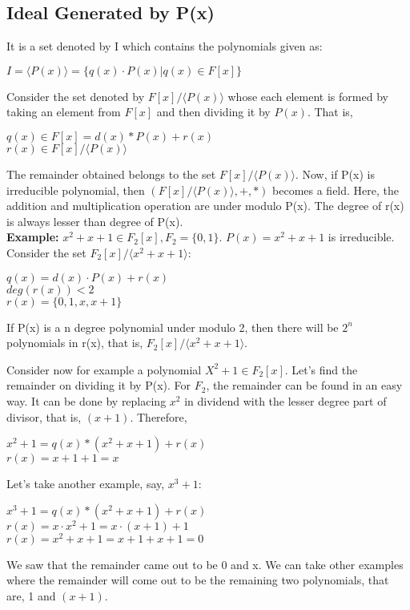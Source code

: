 \documentclass[11pt]{article}
\begin{document}
\subsection{Ideal Generated by P(x)}
It is a set denoted by I which contains the polynomials given as:
\begin{center}
    $I = \langle P(x) \rangle = \{q(x) \cdot P(x) | q(x) \in F[x]\}$
\end{center}

Consider the set denoted by $F[x]/\langle P(x)  \rangle$ whose each element is formed by taking an element from $F[x]$ and then dividing it by $P(x)$. That is,
\begin{center}
    $q(x) \in F[x] = d(x) * P(x) + r(x)$\\
    \vspace{1mm}
    $r(x) \in F[x]/\langle P(x)  \rangle$
\end{center}
The remainder obtained belongs to the set $F[x]/\langle P(x)\rangle$. Now, if P(x) is irreducible polynomial, then $(F[x]/\langle P(x) \rangle, +, *)$ becomes a field. Here, the addition and multiplication operation are under modulo P(x). The degree of r(x) is always lesser than degree of P(x).\\

\textbf{Example:} $x^2 + x + 1 \in F_2[x], F_2 = \{0, 1\}$. $P(x) = x^2 + x + 1$ is irreducible.\\

Consider the set $F_2[x]/\langle x^2 + x + 1\rangle$:
\begin{center}
    $q(x) = d(x) \cdot P(x) + r(x)$\\
    $deg(r(x)) < 2$\\
    $r(x) = \{0, 1, x, x + 1\}$
\end{center}

If P(x) is a n degree polynomial under modulo 2, then there will be $2^n$ polynomials in r(x), that is, $F_2[x]/\langle x^2 + x + 1\rangle$.

Consider now for example a polynomial $X^2 + 1 \in F_2[x]$. Let's find the remainder on dividing it by P(x). For $F_2$, the remainder can be found in an easy way. It can be done by replacing $x^2$ in dividend with the lesser degree part of divisor, that is, $(x + 1)$. Therefore, 
\begin{center}
    $x^2 + 1 = q(x) * (x^2 + x + 1) + r(x)$\\
    $r(x) = x + 1 + 1 = x$
\end{center}

Let's take another example, say, $x^3 + 1$:
\begin{center}
    $x^3 + 1 = q(x) * (x^2 + x + 1) + r(x)$\\
    $r(x) = x \cdot x^2 + 1 = x \cdot (x + 1) + 1$\\
    $r(x) = x^2 + x + 1 = x + 1 + x + 1 = 0$
\end{center}
We saw that the remainder came out to be 0 and x. We can take other examples where the remainder will come out to be the remaining two polynomials, that are, 1 and $(x + 1)$.
\end{document}
